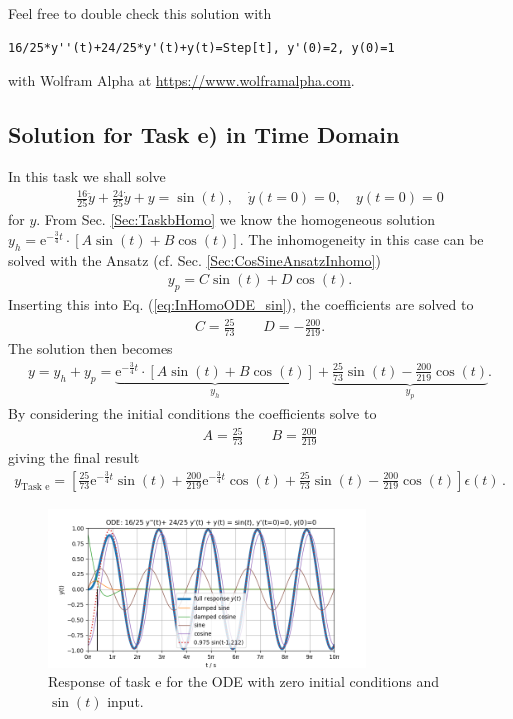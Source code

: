 \documentclass[a4paper,11pt,oneside]{scrartcl}
\newcommand{\eq}[1]{Eq. (\ref{#1})}
\begin{document}
Feel free to double check this solution with
\begin{verbatim}
16/25*y''(t)+24/25*y'(t)+y(t)=Step[t], y'(0)=2, y(0)=1
\end{verbatim}
with Wolfram Alpha at \url{https://www.wolframalpha.com}.





\subsection{Solution for Task e) in Time Domain}
In this task we shall solve
\begin{align}
\label{eq:InHomoODE_sin}
\frac{16}{25} \ddot{y} + \frac{24}{25} \dot{y} + y = \sin(t), \quad
\dot{y}(t=0) = 0,\quad y(t=0)=0
\end{align}
for $y$.
%
From Sec. \ref{Sec:TaskbHomo} we know the homogeneous solution
$y_h = \mathrm{e}^{-\frac{3}{4} t} \cdot
\left[ A \sin(t) + B \cos(t)\right]$.
%
The inhomogeneity in this case can be solved with the Ansatz (cf.
Sec. \ref{Sec:CosSineAnsatzInhomo})
\begin{align}
y_p = C \sin(t) + D \cos(t).
\end{align}
Inserting this into \eq{eq:InHomoODE_sin}, the
coefficients are solved to
\begin{align}
C = \frac{25}{73}\qquad D = -\frac{200}{219}.
\end{align}
%
The solution then becomes
\begin{align}
y = y_h + y_p = \underbrace{\mathrm{e}^{-\frac{3}{4} t} \cdot
\left[ A \sin(t) + B \cos(t)\right]}_{y_h}+
\underbrace{\frac{25}{73} \sin(t) - \frac{200}{219} \cos(t)}_{y_p}.
\end{align}
By considering the initial conditions the coefficients solve to
\begin{align}
A = \frac{25}{73}\qquad B = \frac{200}{219}
\end{align}
giving the final result
\begin{align}
\boxed{
y_\text{Task e} = \left[\frac{25}{73} \mathrm{e}^{-\frac{3}{4} t} \sin(t) +
\frac{200}{219} \mathrm{e}^{-\frac{3}{4} t} \cos(t) +
\frac{25}{73} \sin(t) -
\frac{200}{219} \cos(t)\right] \epsilon(t)}\,.
\end{align}
%
\begin{figure}[h!]
\centering
\includegraphics[width=0.75\textwidth]{sine_excitation_response}
\caption{Response of task e for the ODE with zero initial conditions and
$\sin(t)$ input.}
\label{fig:sine_excitation_response}
\end{figure}
\end{document}
